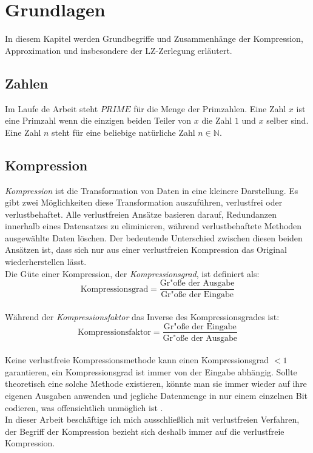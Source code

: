 
\chapter{Grundlagen }

In diesem Kapitel werden Grundbegriffe und Zusammenhänge der Kompression, Approximation und insbesondere der LZ-Zerlegung erläutert.
\section{Zahlen}
Im Laufe de Arbeit steht $PRIME$ für die Menge der Primzahlen. Eine Zahl $x$ ist eine Primzahl wenn die einzigen beiden Teiler von $x$ die Zahl $1$ und $x$ selber sind. Eine Zahl $n$ steht für eine beliebige natürliche Zahl $n\in\mathbb{N}$.

\section{Kompression}

\emph{Kompression} ist die Transformation von Daten in eine kleinere Darstellung.
Es gibt zwei Möglichkeiten diese Transformation auszuführen, verlustfrei oder verlustbehaftet.
Alle verlustfreien Ansätze basieren darauf, Redundanzen innerhalb eines Datensatzes zu eliminieren, während verlustbehaftete Methoden ausgewählte Daten löschen.
Der bedeutende Unterschied zwischen diesen beiden Ansätzen ist, dass sich nur aus einer verlustfreien Kompression das Original wiederherstellen lässt.\\
Die Güte einer Kompression, der \emph{Kompressionsgrad}, ist definiert als:
\begin{equation}\nonumber
\text{Kompressionsgrad} =\frac{\text{Gr"o\ss e der Ausgabe}}{\text{Gr"o\ss e der Eingabe}}
\end{equation}
\\
\noindent
Während der \emph{Kompressionsfaktor} das Inverse des Kompressionsgrades ist:
\begin{equation}\nonumber
\text{Kompressionsfaktor} =\frac{\text{Gr"o\ss e der Eingabe}}{\text{Gr"o\ss e der Ausgabe}}
\end{equation}
\\
\noindent
Keine verlustfreie Kompressionsmethode kann einen Kompressionsgrad $<1$ garantieren, ein Kompressionsgrad ist immer von der Eingabe abhängig. Sollte theoretisch eine solche Methode existieren, könnte man sie immer wieder auf ihre eigenen Ausgaben anwenden und jegliche Datenmenge in nur einem einzelnen Bit codieren, was offensichtlich unmöglich ist \cite{compressreff}.\\
In dieser Arbeit beschäftige ich mich ausschließlich mit verlustfreien Verfahren, der Begriff der Kompression bezieht sich deshalb immer auf die verlustfreie Kompression.


